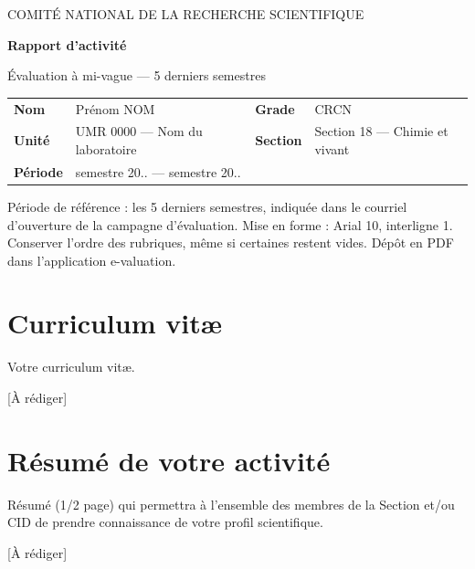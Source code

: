 \documentclass[10pt,a4paper]{article}
\newcommand{\Nom}{Prénom NOM}
\newcommand{\Grade}{CRCN}
\newcommand{\Unite}{UMR 0000 --- Nom du laboratoire}
\newcommand{\SectionCN}{Section 18 --- Chimie et vivant}
\newcommand{\Periode}{semestre 20.. --- semestre 20..}
\newcommand{\arediger}{\textcolor{gris}{[À rédiger]}}
\begin{document}
\begin{tcolorbox}[enhanced, sharp corners, boxrule=0pt, colback=cnrsclair,
    borderline west={4pt}{0pt}{cnrs}, left=14pt, right=10pt, top=10pt, bottom=10pt]
  {\footnotesize\color{cnrs}\MakeUppercase{Comité national de la recherche scientifique}}\par\vspace{3pt}
  {\LARGE\bfseries\color{cnrs}Rapport d'activité}\par\vspace{2pt}
  {\large Évaluation à mi-vague --- 5 derniers semestres}\par\medskip
  {\small
  \begin{tabularx}{\linewidth}{@{}>{\bfseries}l X >{\bfseries}l X@{}}
    Nom & \Nom & Grade & \Grade \\
    Unité & \Unite & Section & \SectionCN \\
    Période & \Periode & & \\
  \end{tabularx}}
\end{tcolorbox}

\begin{consigne}
Période de référence : les 5 derniers semestres, indiquée dans le courriel d'ouverture de la campagne d'évaluation. Mise en forme : Arial 10, interligne 1. Conserver l'ordre des rubriques, même si certaines restent vides. Dépôt en PDF dans l'application e-valuation.
\end{consigne}


\section{Curriculum vitæ}
\begin{consigne}
Votre curriculum vitæ.
\end{consigne}
\arediger %

\section{Résumé de votre activité}
\begin{consigne}
Résumé (1/2 page) qui permettra à l'ensemble des membres de la Section et/ou CID de prendre connaissance de votre profil scientifique.
\end{consigne}
\arediger %
\end{document}
